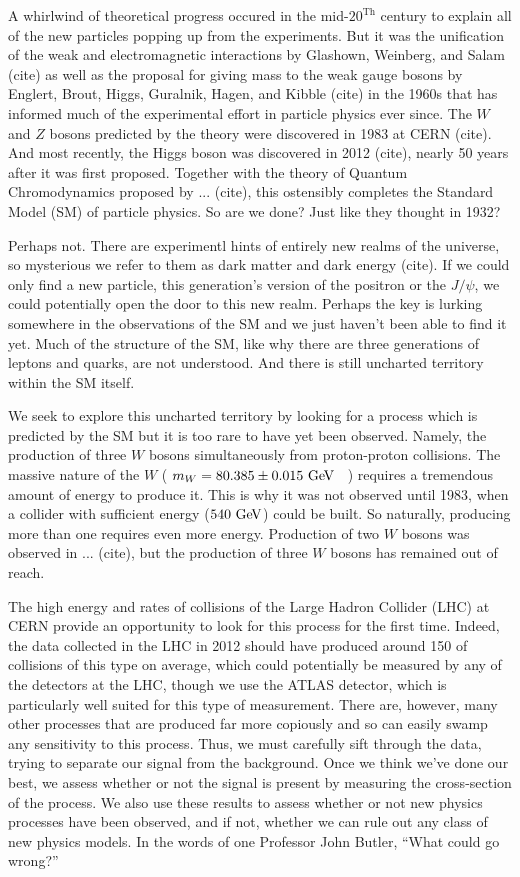 A whirlwind of theoretical progress occured in the mid-$20^{\textrm{Th}}$ century
to explain all of the new particles popping up from the experiments. 
But it was the unification of the weak and electromagnetic interactions
by Glashown, Weinberg, and Salam (cite) as well as the proposal for giving
mass to the weak gauge bosons by Englert, Brout, Higgs, Guralnik, Hagen,
and Kibble (cite) in the 1960s that has informed much of the experimental effort in particle
physics ever since. The $W$ and $Z$ bosons predicted by the theory were discovered in 
1983 at CERN (cite). And most recently, the Higgs boson was discovered in 2012 (cite),
nearly 50 years after it was first proposed. Together with the theory of Quantum Chromodynamics
proposed by ... (cite), this ostensibly completes the Standard Model (SM) of particle physics. 
So are we done? Just like they thought in 1932?


Perhaps not. There are experimentl hints of entirely new realms of the universe, 
so mysterious we refer to them as dark matter and dark energy (cite). 
If we could only find a new particle, this generation's version of the positron
or the $J/\psi$, we could potentially open the door to this new realm.
Perhaps the key is lurking somewhere in the observations of the SM and we just haven't been 
able to find it yet.  Much of the structure
of the SM, like why there are three generations of leptons and quarks, are not understood.
And there is still uncharted territory within the SM itself.

We seek to explore this uncharted territory by looking for a process which is predicted
by the SM but it is too rare to have yet been observed.  Namely, the production of 
three $W$ bosons simultaneously from proton-proton collisions. The massive nature of the 
$W$ ( $m_W = 80.385 \pm 0.015\GeV$~\cite{PDG:2014} ) requires a tremendous amount of energy 
to produce it. This is why it was not observed until 1983, when a collider with sufficient
energy ($540 \GeV$) could be built. So naturally, producing more than one requires
even more energy. Production of two $W$ bosons was observed in ... (cite), but 
the production of three $W$ bosons has remained out of reach. 


The high energy and rates of collisions of the Large Hadron Collider (LHC) at CERN
provide an opportunity to look for this process for the first time. 
Indeed, the data collected in the LHC in 2012 should have produced around 150 of collisions
of this type on average, which could potentially be measured by any of the detectors
at the LHC, though we use the ATLAS detector, which is particularly well suited 
for this type of measurement. There are, however, many other processes that are produced
far more copiously and so can easily swamp any sensitivity to this process. 
Thus, we must carefully sift through the data, trying to separate our signal
from the background.  Once we think we've done our best, we assess 
whether or not the signal is present by measuring the cross-section of the process. 
We also use these results to assess whether or not new physics processes have been 
observed, and if not, whether we can rule out any class of new physics models. 
In the words of one Professor John Butler, ``What could go wrong?''


